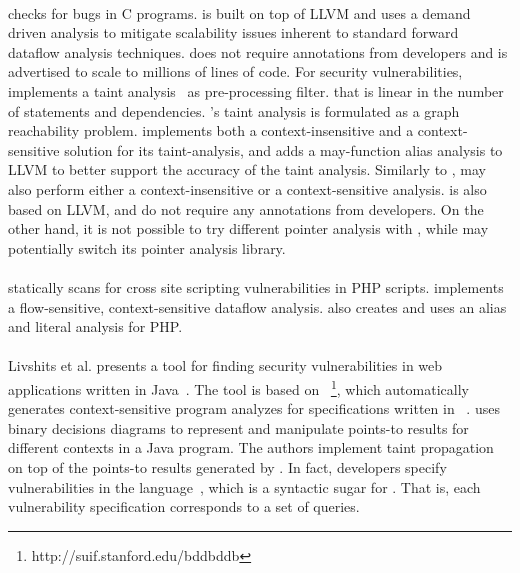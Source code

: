 \paragraph{\parfait}\cite{Parfait:2008} checks for bugs
in C programs. \parfait is built on top of LLVM and uses
a demand driven analysis to mitigate scalability issues
inherent to standard forward dataflow analysis techniques.	
\parfait does not require annotations from developers and
is advertised to scale to millions of lines of code. 
For security vulnerabilities, \parfait implements a taint
analysis~\cite{Scholz:2008:UDA} as pre-processing filter.
that is linear in the number of statements and dependencies.
\parfait's taint analysis is formulated as a graph reachability
problem. \parfait implements both a context-insensitive and
a context-sensitive solution for its taint-analysis, and 
adds a may-function alias analysis to LLVM to better support
the accuracy of the taint analysis.
Similarly to \parfait, \waint may also perform either a
context-insensitive or a context-sensitive analysis. \waint
is also based on LLVM, and do not require any annotations
from developers.
On the other hand, it is not possible to try different pointer
analysis with \parfait, while \waint may potentially switch
its pointer analysis library.

\paragraph{\pixy}\cite{Jovanovic:2006:Pixy} statically scans
for cross site scripting vulnerabilities in PHP scripts. \pixy
implements a flow-sensitive, context-sensitive dataflow analysis.
\pixy also creates and uses an alias and literal analysis for PHP.

\paragraph{}Livshits et al. presents a tool for finding
security vulnerabilities in web applications written in Java~\cite{livshits05finding}.
The tool is based on \bddbddb~\footnote{http://suif.stanford.edu/bddbddb},
which automatically generates context-sensitive program analyzes
for specifications written in \datalog~\cite{Ullman:1988:datalog}.
\bddbddb uses binary decisions diagrams to represent and manipulate
points-to results for different contexts in a Java program. The authors
implement taint propagation on top of the points-to results generated
by \bddbddb.
In fact, developers specify vulnerabilities in the \pql
language~\cite{Martin:2005:PQL}, which is a syntactic sugar for \datalog. 
That is, each vulnerability specification corresponds to a set of
\pql queries.

